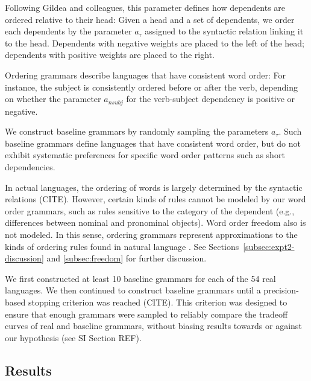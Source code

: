 Following Gildea and colleagues, this parameter defines how dependents are ordered relative to their head:
Given a head and a set of dependents, we order each dependents by the parameter $a_\tau$ assigned to the syntactic relation linking it to the head.
Dependents with negative weights are placed to the left of the head; dependents with positive weights are placed to the right.

Ordering grammars describe languages that have consistent word order:
For instance, the subject is consistently ordered before or after the verb, depending on whether the parameter $a_{nsubj}$ for the verb-subject dependency is positive or negative.

We construct baseline grammars by randomly sampling the parameters $a_\tau$.
Such baseline grammars define languages that have consistent word order, but do not exhibit systematic preferences for specific word order patterns such as short dependencies.


In actual languages, the ordering of words is largely determined by the syntactic relations (CITE).
However, certain kinds of rules cannot be modeled by our word order grammars, such as rules sensitive to the category of the dependent (e.g., differences between nominal and pronominal objects).
Word order freedom also is not modeled.
In this sense, ordering grammars represent approximations to the kinds of ordering rules found in natural language \citep{gildea-optimizing-2007, gildea-grammars-2010, gildea-human-2015}.
See Sections~\ref{subsec:expt2-discussion} and \ref{subsec:freedom} for further discussion.


We first constructed at least 10 baseline grammars for each of the 54 real languages.
We then continued to construct baseline grammars until a precision-based stopping criterion was reached (CITE). This criterion was designed to ensure that enough grammars were sampled to reliably compare the tradeoff curves of real and baseline grammars, without biasing results towards or against our hypothesis (see SI Section REF).

\subsection{Results}\label{sec:main-experiment-results}

